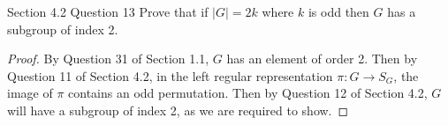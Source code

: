 Section 4.2 Question 13
Prove that if $|G|=2k$ where $k$ is odd then $G$ has a subgroup of index 2.

\begin{proof}
  By Question 31 of Section 1.1, $G$ has an element of order 2. Then by
  Question 11 of Section 4.2, in the left regular representation
  $\pi:G\rightarrow S_G$, the image of $\pi$ contains an odd permutation.
  Then by Question 12 of Section 4.2, $G$ will have a subgroup of index 2,
  as we are required to show.
\end{proof}
